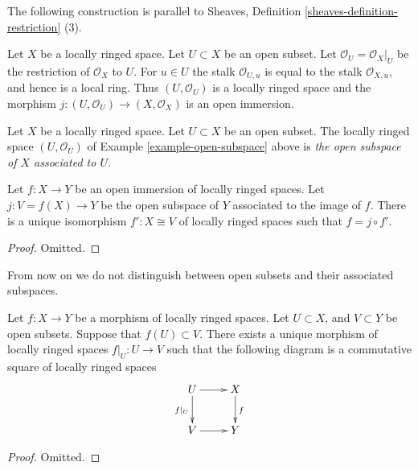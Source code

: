 \noindent
The following construction is parallel to 
Sheaves, Definition \ref{sheaves-definition-restriction} (3).

\begin{example}
\label{example-open-subspace}
Let $X$ be a locally ringed space.
Let $U \subset X$ be an open subset.
Let $\mathcal{O}_U = \mathcal{O}_X|_U$
be the restriction of $\mathcal{O}_X$ to $U$.
For $u \in U$ the stalk $\mathcal{O}_{U, u}$
is equal to the stalk $\mathcal{O}_{X, u}$, and hence is a
local ring. Thus $(U, \mathcal{O}_U)$ is a locally ringed
space and the morphism $j : (U, \mathcal{O}_U) \to (X, \mathcal{O}_X)$
is an open immersion.
\end{example}

\begin{definition}
\label{definition-open-subspace}
Let $X$ be a locally ringed space.
Let $U \subset X$ be an open subset.
The locally ringed space $(U, \mathcal{O}_U)$
of Example \ref{example-open-subspace} above
is {\it the open subspace of $X$ associated to $U$}.
\end{definition}

\begin{lemma}
\label{lemma-open-immersion}
Let $f : X \to Y$ be an open immersion of 
locally ringed spaces. Let $j : V = f(X) \to Y$
be the open subspace of $Y$ associated to the image of $f$.
There is a unique isomorphism $f' : X \cong V$ of
locally ringed spaces such that $f = j \circ f'$.
\end{lemma}

\begin{proof}
Omitted.
\end{proof}

\noindent
From now on we do not distinguish between open subsets
and their associated subspaces.

\begin{lemma}
\label{lemma-restrict-map-to-opens}
Let $f : X \to Y$ be a morphism of locally ringed spaces.
Let $U \subset X$, and $V \subset Y$ be open subsets.
Suppose that $f(U) \subset V$. There exists a unique
morphism of locally ringed spaces $f|_U : U \to V$ such
that the following diagram is a commutative square of
locally ringed spaces
$$
\xymatrix{
U \ar[d]_{f|_U} \ar[r] & X \ar[d]^f \\
V \ar[r] & Y 
}
$$
\end{lemma}

\begin{proof}
Omitted.
\end{proof}

